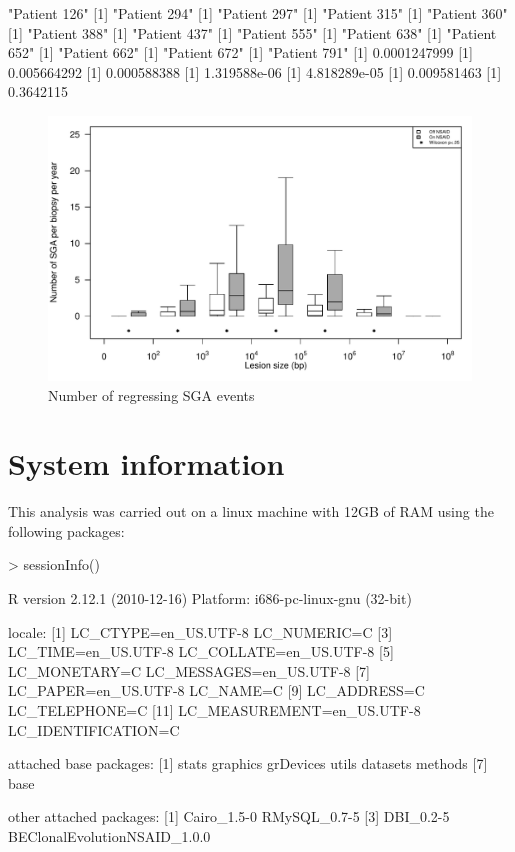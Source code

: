 \documentclass[12pt]{article}
\begin{document}
\begin{Schunk}
\begin{Soutput}
[1] "Patient 126"
[1] "Patient 294"
[1] "Patient 297"
[1] "Patient 315"
[1] "Patient 360"
[1] "Patient 388"
[1] "Patient 437"
[1] "Patient 555"
[1] "Patient 638"
[1] "Patient 652"
[1] "Patient 662"
[1] "Patient 672"
[1] "Patient 791"
[1] 0.0001247999
[1] 0.005664292
[1] 0.000588388
[1] 1.319588e-06
[1] 4.818289e-05
[1] 0.009581463
[1] 0.3642115
\end{Soutput}
\end{Schunk}


\begin{figure}[t!]
  \centering
  \includegraphics[width=\textwidth]{figures/guide-Figure3B.pdf}
  \caption{\label{fig:f3b} Number of regressing SGA events  }
\end{figure}


\section{System information}

This analysis was carried out on a linux machine with 12GB of RAM
using the following packages:

\begin{Schunk}
\begin{Sinput}
> sessionInfo()
\end{Sinput}
\begin{Soutput}
R version 2.12.1 (2010-12-16)
Platform: i686-pc-linux-gnu (32-bit)

locale:
 [1] LC_CTYPE=en_US.UTF-8       LC_NUMERIC=C              
 [3] LC_TIME=en_US.UTF-8        LC_COLLATE=en_US.UTF-8    
 [5] LC_MONETARY=C              LC_MESSAGES=en_US.UTF-8   
 [7] LC_PAPER=en_US.UTF-8       LC_NAME=C                 
 [9] LC_ADDRESS=C               LC_TELEPHONE=C            
[11] LC_MEASUREMENT=en_US.UTF-8 LC_IDENTIFICATION=C       

attached base packages:
[1] stats     graphics  grDevices utils     datasets  methods  
[7] base     

other attached packages:
[1] Cairo_1.5-0                  RMySQL_0.7-5                
[3] DBI_0.2-5                    BEClonalEvolutionNSAID_1.0.0
\end{Soutput}
\end{Schunk}
\end{document}
